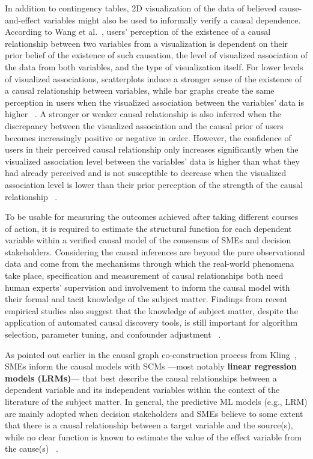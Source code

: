 \documentclass{sfuthesis}
\begin{document}
In addition to contingency tables, 2D visualization of the data of believed cause-and-effect variables might also be used to informally verify a causal dependence. According to Wang et al.~\cite{wang_causal_2025}, users’ perception of the existence of a causal relationship between two variables from a visualization is dependent on their prior belief of the existence of such causation, the level of visualized association of the data from both variables, and the type of visualization itself. For lower levels of visualized associations, scatterplots induce a stronger sense of the existence of a causal relationship between variables, while bar graphs create the same perception in users when the visualized association between the variables’ data is higher ~\cite{wang_causal_2025}. A stronger or weaker causal relationship is also inferred when the discrepancy between the visualized association and the causal prior of users becomes increasingly positive or negative in order. However, the confidence of users in their perceived causal relationship only increases significantly when the visualized association level between the variables’ data is higher than what they had already perceived and is not susceptible to decrease when the visualized association level is lower than their prior perception of the strength of the causal relationship ~\cite{wang_causal_2025}.\par
To be usable for measuring the outcomes achieved after taking different courses of action, it is required to estimate the structural function for each dependent variable within a verified causal model of the consensus of SMEs and decision stakeholders. Considering the causal inferences are beyond the pure observational data and come from the mechanisms through which the real-world phenomena take place, specification and measurement of causal relationships both need human experts' supervision and involvement to inform the causal model with their formal and tacit knowledge of the subject matter. Findings from recent empirical studies also suggest that the knowledge of subject matter, despite the application of automated causal discovery tools, is still important for algorithm selection, parameter tuning, and confounder adjustment ~\cite{gururaghavendran_can_2025}.\par
As pointed out earlier in the causal graph co-construction process from Kling~\cite{kling2025co}, SMEs inform the causal models with SCMs —most notably \textbf{linear regression models (LRMs)}— that best describe the causal relationships between a dependent variable and its independent variables within the context of the literature of the subject matter. In general, the predictive ML models (e.g., LRM) are mainly adopted when decision stakeholders and SMEs believe to some extent that there is a causal relationship between a target variable and the source(s), while no clear function is known to estimate the value of the effect variable from the cause(s) ~\cite{renero_rex_2026}.\par
\end{document}

